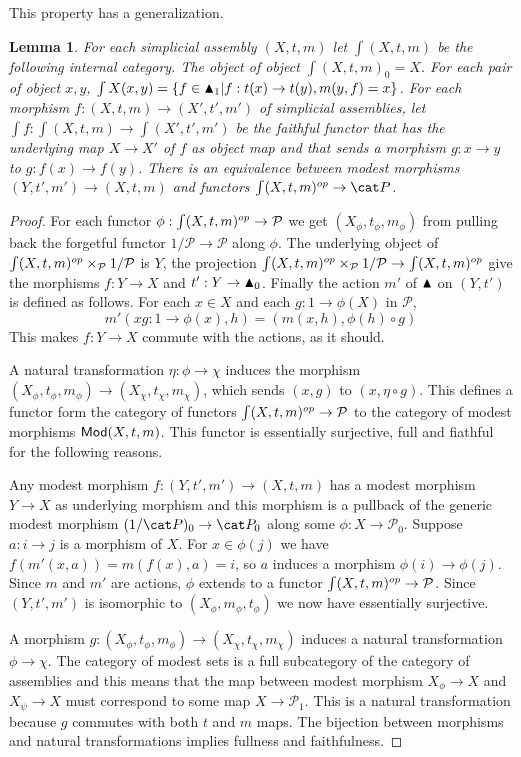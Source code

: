 \documentclass{amsart}
\theoremstyle{plain}
\newtheorem{lemma}[theorem]{Lemma}
\theoremstyle{definition}
\newcommand\cat\mathcal
\newcommand\set[1]{\left\{#1\right\}}
\begin{document}
This property has a generalization.

\newcommand\elt{\int}
\begin{lemma} For each simplicial assembly $(X,t,m)$ let $\elt (X,t,m)$ be the following internal category. The object of object $\elt(X,t,m)_0 = X$. For each pair of object $x,y$, $\elt X(x,y) = \set{ f\in \simpcat_1| f:t(x)\to t(y), m(y,f) = x}$. For each morphism $f:(X,t,m)\to(X',t',m')$ of simplicial assemblies, let $\elt f:\elt(X,t,m)\to \elt(X',t',m')$ be the faithful functor that has the underlying map $X\to X'$ of $f$ as object map and that sends a morphism $g:x\to y$ to $g:f(x)\to f(y)$. There is an equivalence between modest morphisms $(Y,t',m') \to (X,t,m)$ and functors $\elt(X,t,m)\dual \to \pers$. \end{lemma}

\begin{proof} For each functor $\phi:\elt(X,t,m)\dual \to \cat P$ we get $(X_\phi,t_\phi,m_\phi)$ from pulling back the forgetful functor $1/\cat P \to \cat P$ along $\phi$. The underlying object of $\elt(X,t,m)\dual\times_{\cat P} 1/\cat P$ is $Y$, the projection $\elt(X,t,m)\dual\times_{\cat P} 1/\cat P \to \elt(X,t,m)\dual$ give the morphisms $f:Y\to X$ and $t':Y\to \blacktriangle_0$. Finally the action $m'$ of $\blacktriangle$ on $(Y,t')$ is defined as follows. For each $x\in X$ and each $g:1\to \phi(X)$ in $\cat P$,
\[ m'( x g:1\to \phi(x) ,h) = (m(x,h),\phi(h)\circ g) \]
This makes $f:Y\to X$ commute with the actions, as it should.

A natural transformation $\eta:\phi \to \chi$ induces the morphism $(X_\phi,t_\phi,m_\phi) \to (X_\chi,t_\chi,m_\chi)$, which sends $(x,g)$ to $(x,\eta\circ g)$. This defines a functor form the category of functors $\elt(X,t,m)\dual\to\cat P$ to the category of modest morphisms $\mathsf{Mod}(X,t,m)$. This functor is essentially surjective, full and fiathful for the following reasons.

Any modest morphism $f:(Y,t',m') \to (X,t,m)$ has a modest morphism $Y\to X$ as underlying morphism and this morphism is a pullback of the generic modest morphism $(1/\pers)_0 \to \pers_0$ along some $\phi: X\to \cat P_0$. Suppose $a:i\to j$ is a morphism of $X$. For $x\in \phi(j)$ we have $f(m'(x,a)) = m(f(x),a) = i$, so $a$ induces a morphism $\phi(i)\to \phi(j)$. Since $m$ and $m'$ are actions, $\phi$ extends to a functor $\elt(X,t,m)\dual \to \cat P$. Since $(Y,t', m')$ is isomorphic to $(X_\phi,m_\phi,t_\phi)$ we now have essentially surjective. %

A morphism $g:(X_\phi,t_\phi,m_\phi) \to (X_\chi,t_\chi,m_\chi)$ induces a natural transformation $\phi \to \chi$. The category of modest sets is a full subcategory of the category of assemblies and this means that the map between modest morphism $X_\phi \to X$ and $X_\psi\to X$ must correspond to some map $X\to\cat P_1$. This is a natural transformation because $g$ commutes with both $t$ and $m$ maps. The bijection between morphisms and natural transformations implies fullness and faithfulness.
\end{proof}
\end{document}
